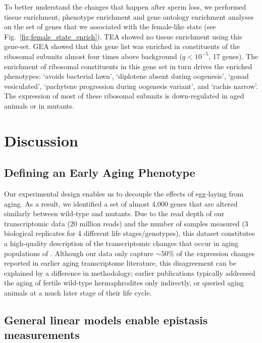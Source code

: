 To better understand the changes that happen after sperm loss, we performed
tissue enrichment, phenotype enrichment and gene ontology enrichment analyses on
the set of \femalen{} genes that we associated with the female-like state (see
Fig.~\ref{fig:female_state_enrich}). TEA showed no tissue enrichment using this
gene-set. GEA showed that this gene list was enriched in constituents of the
ribosomal subunits almost four times above background ($q<10^{-5}$, 17 genes).
The enrichment of ribosomal constituents in this gene set in turn drives the
enriched phenotypes: `avoids bacterial lawn', `diplotene absent during
oogenesis', `gonad vesiculated', `pachytene progression during oogenesis
variant', and `rachis narrow'. The expression of most of these ribosomal
subunits is down-regulated in aged animals or in \fog{} mutants.

\section{Discussion}
\label{sec:fem_discussion}

\subsection*{Defining an Early Aging Phenotype}
\label{sub:Defining an Early Aging Phenotype}

Our experimental design enables us to decouple the effects of egg-laying from
aging. As a result, we identified a set of almost 4,000 genes that are altered
similarly between wild-type and \fog{} mutants. Due to the read depth of our
transcriptomic data (20 million reads) and the number of samples measured (3
biological replicates for 4 different life stages/genotypes), this dataset
constitutes a high-quality description of the transcriptomic changes that occur
in aging populations of \cel{}. Although our data only capture $\sim50\%$ of the
expression changes reported in earlier aging transcriptome literature, this
disagreement can be explained by a difference in methodology; earlier
publications typically addressed the aging of fertile wild-type hermaphrodites
only indirectly, or queried aging animals at a much later stage of their life
cycle.


\subsection*{General linear models enable epistasis measurements}
\label{sub:lin_models}


